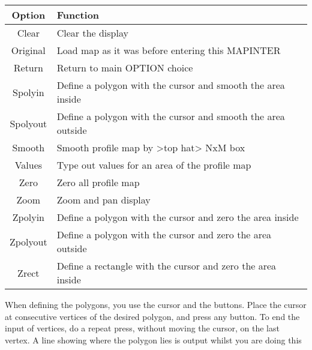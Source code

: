 {{{\begin{tabular}{|c|l|}\hline                                                                               
  Option    &   Function \\ \hline
  Clear     &   Clear the display \\
  Original  &   Load map as it was before entering this MAPINTER \\
  Return    &   Return to main OPTION choice \\
  Spolyin   &   Define a polygon with the cursor and smooth the
                area inside \\
  Spolyout  &   Define a polygon with the cursor and smooth the
                area outside \\
  Smooth    &   Smooth profile map by >top hat> NxM box \\
  Values    &   Type out values for an area of the profile map \\
  Zero      &   Zero all profile map \\
  Zoom      &   Zoom and pan display \\
  Zpolyin   &   Define a polygon with the cursor and zero the area
                inside \\
  Zpolyout  &   Define a polygon with the cursor and zero the area
                outside \\
  Zrect     &   Define a rectangle with the cursor and zero the
                area inside \\ \hline
\end{tabular}
                                                                  
 When defining the polygons, you use the cursor and the buttons. Place
 the cursor at consecutive vertices of the desired polygon, and press
 any button. To end the input of vertices, do a repeat press, without
 moving the cursor, on the last vertex. A line showing where the
 polygon lies is output whilst you are doing this
                                                                               
}}}
